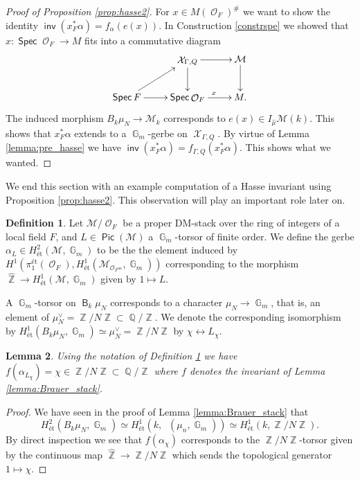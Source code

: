\documentclass{article}
\DeclareMathOperator{\Hom}{\mathsf{Hom}}
\DeclareMathOperator{\inv}{\mathsf{inv}}
\DeclareMathOperator{\B}{\mathsf{B}}
\DeclareMathOperator{\Xc}{\mathcal{X}}
\DeclareMathOperator{\Zb}{\mathbb{Z}}
\DeclareMathOperator{\G}{\mathbb{G}}
\newcommand{\Mc}{\mathcal{M}}
\DeclareMathOperator{\Spec}{\mathsf{Spec}}
\DeclareMathOperator{\Hhom}{\underline{\Hom}}
\DeclareMathOperator{\Oo}{\mathcal{O}}
\DeclareMathOperator{\Qb}{\mathbb{Q}}
\DeclareMathOperator{\Pic}{\mathsf{Pic}}
\theoremstyle{definition}
\newtheorem{definition}{Definition}[section]
\theoremstyle{plain}
\newtheorem{lemma}[definition]{Lemma}
\begin{document}
\begin{proof}[Proof of Proposition \ref{prop:hasse2}]
For $x \in M(\Oo_F)^{\#}$ we want to show the identity $\inv(x_F^*\alpha) = f_{\alpha}(e(x))$. In Construction \ref{constrspe} we showed that $x\colon \Spec \Oo_F \to M$ fits into a commutative diagram
\[
\xymatrix{
& \Xc_{\Gamma,Q} \ar[r] \ar[d] & \Mc \ar[d] \\
\Spec F \ar[r] \ar[ru] & \Spec \Oo_F \ar[r]^x & M.
}
\]
The induced morphism $B_k\mu_N \to \Mc_k$ corresponds to $e(x) \in I_{\widehat{\mu}}\Mc(k)$.
This shows that $x_F^*\alpha$ extends to a $\G_m$-gerbe on $\Xc_{\Gamma,Q}$. By virtue of Lemma \ref{lemma:pre_hasse} we have $\inv(x_F^*\alpha) = f_{\Gamma,Q}(x_F^*\alpha)$. This shows what we wanted. 
\end{proof}

We end this section with an example computation of a Hasse invariant using Proposition \ref{prop:hasse2}. This observation will play an important role later on.

\begin{definition}\label{defi:unramified_gerbe}
Let $\Mc/\Oo_F$ be a proper DM-stack over the ring of integers of a local field $F$, and $L \in \Pic(\Mc)$ a $\G_m$-torsor of finite order. We define the gerbe $\alpha_L \in H^2_{\text{\'et}}(\Mc,\G_m)$ to be the the element induced by $H^1(\pi_1^{\text{\'et}}(\Oo_F),H^1_{\text{\'et}}(\Mc_{\Oo_{F^{\text{un}}}},\G_m))$ corresponding to the morphism $\widehat{\Zb} \to H^1_{\text{\'et}}(\Mc,\G_m)$ given by $1 \mapsto L$.
\end{definition}

A $\G_m$-torsor on $\B_k\mu_N$ corresponds to a character $\mu_N \to \G_m$, that is, an element of $\mu_N^{\vee} = \Zb/N\Zb \subset \Qb/\Zb$. We denote the corresponding isomorphism by $H^1_{\text{\'et}}(B_k\mu_N,\G_m) \simeq \mu_N^{\vee} = \Zb/N\Zb$ by $\chi \leftrightarrow L_{\chi}$.

\begin{lemma}\label{lemma:unramified_gerbe}
Using the notation of Definition \ref{defi:unramified_gerbe} we have $f(\alpha_{L_{\chi}}) = \chi \in \Zb/N\Zb \subset \Qb/\Zb$ where $f$ denotes the invariant of Lemma \ref{lemma:Brauer_stack}.
\end{lemma}

\begin{proof}
We have seen in the proof of Lemma \ref{lemma:Brauer_stack} that 
$$H^2_{\text{\'et}}(B_k\mu_N,\G_m) \simeq H^1_{\text{\'et}}(k,\Hhom(\mu_n,\G_m))\simeq H^1_{\text{\'et}}(k,\Zb/N\Zb).$$
By direct inspection we see that $f(\alpha_{\chi})$ corresponds to the $\Zb/N\Zb$-torsor given by the continuous map $\widehat{\Zb} \to \Zb/N\Zb$ which sends the topological generator $1 \mapsto \chi$.
\end{proof}
\end{document}
